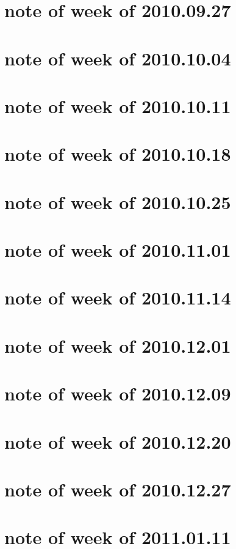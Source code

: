 \documentclass{article}
\begin{document}
\section{note of week of 2010.09.27}

\section{note of week of 2010.10.04}

\section{note of week of 2010.10.11}

\section{note of week of 2010.10.18}

\section{note of week of 2010.10.25}

\section{note of week of 2010.11.01}

\section{note of week of 2010.11.14}

\section{note of week of 2010.12.01}

\section{note of week of 2010.12.09}

\section{note of week of 2010.12.20}

\section{note of week of 2010.12.27}


\section{note of week of 2011.01.11}


\end{document}
